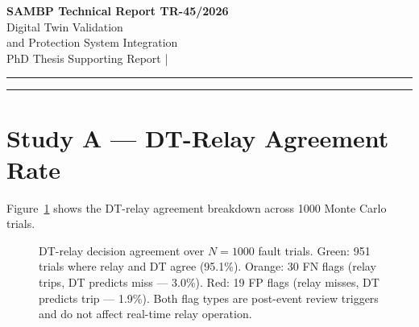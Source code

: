 \documentclass[11pt,a4paper]{article}
\begin{document}
\begin{center}
  {\LARGE\bfseries\color{sambpblue} SAMBP Technical Report TR-45/2026}\\[6pt]
  {\large Digital Twin Validation\\
    and Protection System Integration}\\[10pt]
  {\normalsize PhD Thesis Supporting Report \quad|}
\end{center}

\vspace{2pt}\hrule\vspace{8pt}

\begin{abstract}
\noindent
This report validates the complete digital twin (DT) framework developed in
TR-43--44~\cite{SAMBP_TR43,SAMBP_TR44} against the SAMBP protection scheme
(TR-35, TR-37~\cite{SAMBP_TR37}) using 1000 Monte Carlo trials.  The DT
achieves 95.1\% agreement with the physical relay decisions.  The 4.9\%
disagreement is split between 3.0\% false-negative flags (relay trips where
DT predicts miss, primarily from $k_\mathrm{ibr}$ estimation noise crossing
element thresholds) and 1.9\% false-positive flags (relay misses where DT
predicts trip).  Protection zone classification accuracy --- the operationally
critical metric --- is 98.5\%.  Flag rates are highest in the
$k_\mathrm{ibr}\in[0.06,0.10)$ boundary region (15.4\% FN rate), confirming
that the DT's principal diagnostic value is in threshold-boundary monitoring.
The DT adds zero latency to the protection chain: total fault clearance time
is 52\,ms, 48\,ms within $T_\mathrm{mem}=100$\,ms.
\end{abstract}

\vspace{4pt}\hrule\vspace{10pt}

\section{Study A --- DT-Relay Agreement Rate}
\label{sec:studyA}

Figure~\ref{fig:agreement} shows the DT-relay agreement breakdown across
1000 Monte Carlo trials.

\begin{figure}[htbp]
  \centering
  \resizebox{0.96\textwidth}{!}{}
  \caption{DT-relay decision agreement over $N=1000$ fault trials.  Green:
           951 trials where relay and DT agree (95.1\%).  Orange: 30 FN flags
           (relay trips, DT predicts miss --- 3.0\%).  Red: 19 FP flags
           (relay misses, DT predicts trip --- 1.9\%).  Both flag types are
           post-event review triggers and do not affect real-time relay
           operation.}
  \label{fig:agreement}
\end{figure}
\end{document}
